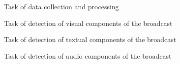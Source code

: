     \begin{figure}[htbp]
        \centering
        \fboxsep=0pt\fboxrule=0.5pt
        {}%
        \caption{Task of data collection and processing}
        \label{fig:CollectionProcessing}
    \end{figure}

    \begin{figure}[htbp]
        \centering
        \fboxsep=0pt\fboxrule=0.5pt
        {}%
        \caption{Task of detection of visual components of the broadcast}
        \label{fig:BroadcastVisualComponents}
    \end{figure}

    \begin{figure}[htbp]
        \centering
        \fboxsep=0pt\fboxrule=0.5pt
        {}%
        \caption{Task of detection of textual components of the broadcast}
        \label{fig:BroadcastTextualComponents}
    \end{figure}

    \begin{figure}[htbp]
        \centering
        \fboxsep=0pt\fboxrule=0.5pt
        {}%
        \caption{Task of detection of audio components of the broadcast}
        \label{fig:BroadcastAudioComponents}
    \end{figure}

